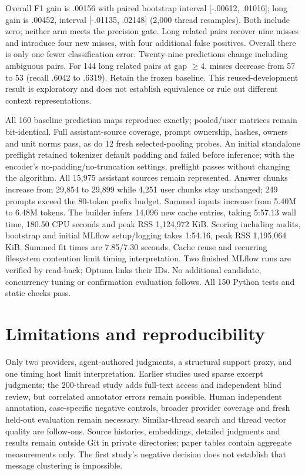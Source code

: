 \documentclass[11pt]{article}
\begin{document}
Overall F1 gain is .00156 with paired bootstrap interval [-.00612, .01016];
long gain is .00452, interval [-.01135, .02148] (2,000 thread resamples).
Both include zero; neither arm meets the precision gate. Long related pairs
recover nine misses and introduce four new misses, with four additional false
positives. Overall there is only one fewer classification error. Twenty-nine
predictions change including ambiguous pairs. For 144 long related pairs at gap
$\geq4$, misses decrease from 57 to 53 (recall .6042 to .6319). Retain the frozen
baseline. This reused-development result is exploratory and does not establish
equivalence or rule out different context representations.

All 160 baseline prediction maps reproduce exactly; pooled/user matrices remain
bit-identical. Full assistant-source coverage, prompt ownership, hashes, owners
and unit norms pass, as do 12 fresh selected-pooling probes. An initial standalone
preflight retained tokenizer default padding and failed before inference; with
the encoder's no-padding/no-truncation settings, preflight passes without changing
the algorithm. All 15,975 assistant sources remain represented. Answer chunks
increase from 29,854 to 29,899 while 4,251 user chunks stay unchanged; 249 prompts
exceed the 80-token prefix budget. Summed inputs increase from 5.40M to 6.48M
tokens. The builder infers 14,096 new cache entries, taking 5:57.13 wall time,
180.50 CPU seconds and peak RSS 1,124,972 KiB. Scoring including audits, bootstrap
and initial MLflow setup/logging takes 1:54.16, peak RSS 1,195,064 KiB. Summed fit
times are 7.85/7.30 seconds. Cache reuse and recurring filesystem contention limit
timing interpretation. Two finished MLflow runs are verified by read-back; Optuna
links their IDs. No additional candidate, concurrency tuning or confirmation
evaluation follows. All 150 Python tests and static checks pass.

\section{Limitations and reproducibility}
Only two providers, agent-authored judgments, a structural support proxy,
and one timing host limit interpretation. Earlier studies used sparse excerpt
judgments; the 200-thread study adds full-text access and independent blind
review, but correlated annotator errors remain possible. Human independent
annotation, case-specific negative controls, broader provider coverage and
fresh held-out evaluation remain necessary. Similar-thread search and thread
vector quality are follow-ons. Source histories, embeddings, detailed judgments
and results remain outside Git in private directories; paper tables contain
aggregate measurements only. The first study's negative decision does not
establish that message clustering is impossible.
\end{document}
